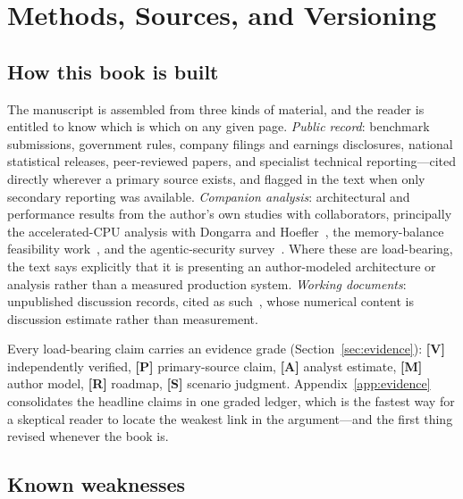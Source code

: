 \chapter*{Methods, Sources, and Versioning}

\section*{How this book is built}

The manuscript is assembled from three kinds of material, and the reader is entitled to know which is which on any given page. \emph{Public record}: benchmark submissions, government rules, company filings and earnings disclosures, national statistical releases, peer-reviewed papers, and specialist technical reporting---cited directly wherever a primary source exists, and flagged in the text when only secondary reporting was available. \emph{Companion analysis}: architectural and performance results from the author's own studies with collaborators, principally the accelerated-CPU analysis with Dongarra and Hoefler~\cite{dhm-cacm,dhm-long}, the memory-balance feasibility work~\cite{riken-study}, and the agentic-security survey~\cite{order66}. Where these are load-bearing, the text says explicitly that it is presenting an author-modeled architecture or analysis rather than a measured production system. \emph{Working documents}: unpublished discussion records, cited as such~\cite{consortium-record}, whose numerical content is discussion estimate rather than measurement.

Every load-bearing claim carries an evidence grade (Section~\ref{sec:evidence}): \textbf{[V]} independently verified, \textbf{[P]} primary-source claim, \textbf{[A]} analyst estimate, \textbf{[M]} author model, \textbf{[R]} roadmap, \textbf{[S]} scenario judgment. Appendix~\ref{app:evidence} consolidates the headline claims in one graded ledger, which is the fastest way for a skeptical reader to locate the weakest link in the argument---and the first thing revised whenever the book is.

\section*{Known weaknesses}


